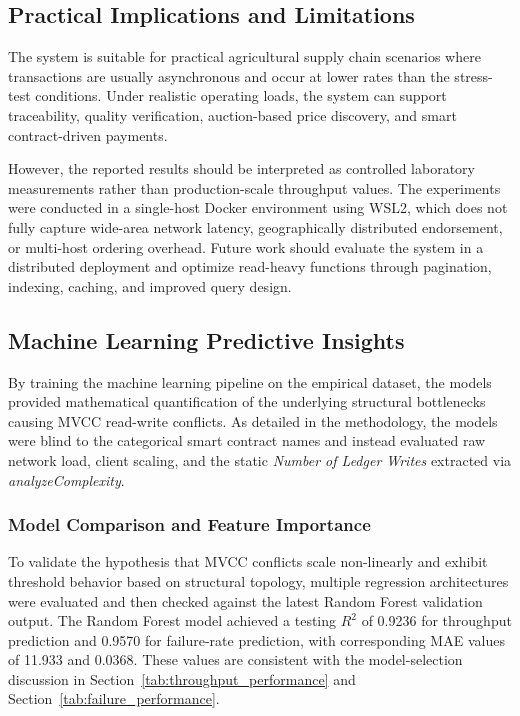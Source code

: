 \documentclass[manuscript,screen,nofonts]{acmart}
\begin{document}
	\subsection{Practical Implications and Limitations}
	
	The system is suitable for practical agricultural supply chain scenarios where transactions are usually asynchronous and occur at lower rates than the stress-test conditions. Under realistic operating loads, the system can support traceability, quality verification, auction-based price discovery, and smart contract-driven payments.
	
	However, the reported results should be interpreted as controlled laboratory measurements rather than production-scale throughput values. The experiments were conducted in a single-host Docker environment using WSL2, which does not fully capture wide-area network latency, geographically distributed endorsement, or multi-host ordering overhead. Future work should evaluate the system in a distributed deployment and optimize read-heavy functions through pagination, indexing, caching, and improved query design.
	
	\subsection{Machine Learning Predictive Insights}
	
	By training the machine learning pipeline on the empirical dataset, the models provided mathematical quantification of the underlying structural bottlenecks causing MVCC read-write conflicts. As detailed in the methodology, the models were blind to the categorical smart contract names and instead evaluated raw network load, client scaling, and the static \textit{Number of Ledger Writes} extracted via \textit{analyzeComplexity}.
	
	\subsubsection{Model Comparison and Feature Importance}
	To validate the hypothesis that MVCC conflicts scale non-linearly and exhibit threshold behavior based on structural topology, multiple regression architectures were evaluated and then checked against the latest Random Forest validation output. The Random Forest model achieved a testing $R^2$ of 0.9236 for throughput prediction and 0.9570 for failure-rate prediction, with corresponding MAE values of 11.933 and 0.0368. These values are consistent with the model-selection discussion in Section~\ref{tab:throughput_performance} and Section~\ref{tab:failure_performance}.
	
\end{document}
